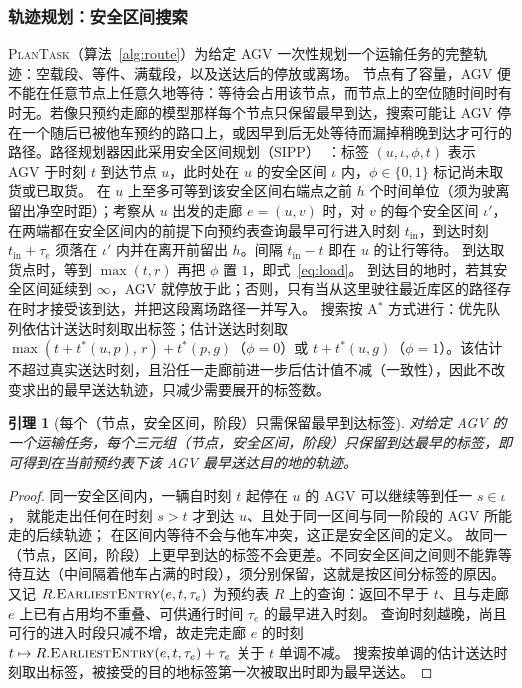 \documentclass[manuscript,screen,review]{acmart}
\newtheorem{lem}{引理}
\begin{document}
\subsubsection{轨迹规划：安全区间搜索}
\label{sec:router}

\textsc{PlanTask}（算法~\ref{alg:route}）为给定 AGV 一次性规划一个运输任务的完整轨迹：空载段、等件、满载段，以及送达后的停放或离场。
节点有了容量，AGV 便不能在任意节点上任意久地等待：等待会占用该节点，而节点上的空位随时间时有时无。若像只预约走廊的模型那样每个节点只保留最早到达，搜索可能让 AGV 停在一个随后已被他车预约的路口上，或因早到后无处等待而漏掉稍晚到达才可行的路径。路径规划器因此采用安全区间规划（SIPP）~\cite{kasaura2022sipp}：标签 $(u,\iota,\phi,t)$ 表示 AGV 于时刻 $t$ 到达节点 $u$，此时处在 $u$ 的安全区间 $\iota$ 内，$\phi\in\{0,1\}$ 标记尚未取货或已取货。
在 $u$ 上至多可等到该安全区间右端点之前 $h$ 个时间单位（须为驶离留出净空时距）；考察从 $u$ 出发的走廊 $e=(u,v)$ 时，对 $v$ 的每个安全区间 $\iota'$，在两端都在安全区间内的前提下向预约表查询最早可行进入时刻 $t_{\text{in}}$，到达时刻 $t_{\text{in}}+\tau_e$ 须落在 $\iota'$ 内并在离开前留出 $h$。间隔 $t_{\text{in}}-t$ 即在 $u$ 的让行等待。
到达取货点时，等到 $\max(t,r)$ 再把 $\phi$ 置 $1$，即式~\eqref{eq:load}。
到达目的地时，若其安全区间延续到 $\infty$，AGV 就停放于此；否则，只有当从这里驶往最近库区的路径存在时才接受该到达，并把这段离场路径一并写入。
搜索按 A$^{*}$ 方式进行：优先队列依估计送达时刻取出标签；估计送达时刻取 $\max(t+t^{*}(u,p),\,r)+t^{*}(p,g)$（$\phi=0$）或 $t+t^{*}(u,g)$（$\phi=1$）。该估计不超过真实送达时刻，且沿任一走廊前进一步后估计值不减（一致性），因此不改变求出的最早送达轨迹，只减少需要展开的标签数。

\begin{lem}[每个（节点，安全区间，阶段）只需保留最早到达标签]
\label{lem:label}
对给定 AGV 的一个运输任务，每个三元组（节点，安全区间，阶段）只保留到达最早的标签，即可得到在当前预约表下该 AGV 最早送达目的地的轨迹。
\end{lem}

\begin{proof}
  同一安全区间内，一辆自时刻 $t$ 起停在 $u$ 的 AGV 可以继续等到任一 $s\in\iota$，
  就能走出任何在时刻 $s>t$ 才到达 $u$、且处于同一区间与同一阶段的 AGV 所能走的后续轨迹；
  在区间内等待不会与他车冲突，这正是安全区间的定义。
  故同一（节点，区间，阶段）上更早到达的标签不会更差。不同安全区间之间则不能靠等待互达（中间隔着他车占满的时段），须分别保留，这就是按区间分标签的原因。
  又记 $R.\textsc{EarliestEntry}(e,t,\tau_e)$ 为预约表 $R$ 上的查询：返回不早于 $t$、且与走廊 $e$ 上已有占用均不重叠、可供通行时间 $\tau_e$ 的最早进入时刻。
  查询时刻越晚，尚且可行的进入时段只减不增，故走完走廊 $e$ 的时刻
  $t\mapsto R.\textsc{EarliestEntry}(e,t,\tau_e)+\tau_e$
  关于 $t$ 单调不减。
  搜索按单调的估计送达时刻取出标签，被接受的目的地标签第一次被取出时即为最早送达。
\end{proof}
\end{document}
